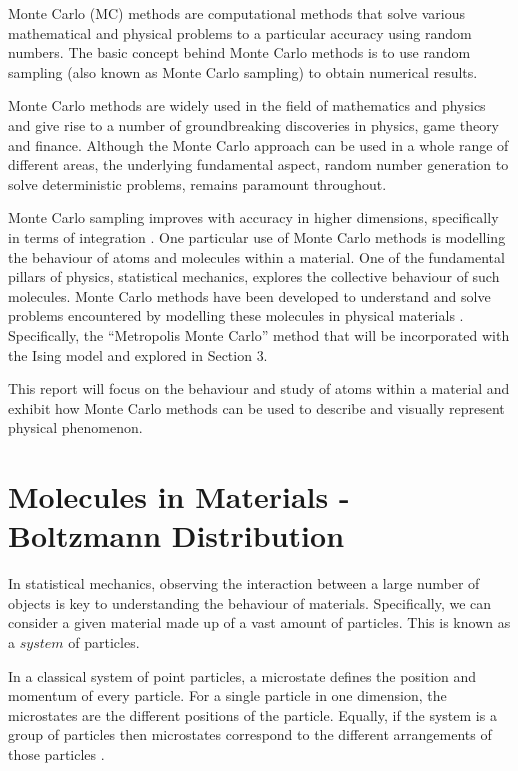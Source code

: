 \documentclass[a4paper]{article}
\begin{document}
Monte Carlo (MC) methods are computational methods that solve various mathematical and physical problems to a particular accuracy using random numbers. The basic concept behind Monte Carlo methods is to use random sampling (also known as Monte Carlo sampling) to obtain numerical results.

Monte Carlo methods are widely used in the field of mathematics and physics and give rise to a number of groundbreaking discoveries in physics, game theory and finance. Although the Monte Carlo approach can be used in a whole range of different areas, the underlying fundamental aspect, random number generation to solve deterministic problems, remains paramount throughout. 

Monte Carlo sampling improves with accuracy in higher dimensions, specifically in terms of integration \cite{1}. One particular use of Monte Carlo methods is modelling the behaviour of atoms and molecules within a material. One of the fundamental pillars of physics, statistical mechanics, explores the collective behaviour of such molecules. Monte Carlo methods have been developed to understand and solve problems encountered by modelling these molecules in physical materials \cite{2}. Specifically, the “Metropolis Monte Carlo” method that will be incorporated with the Ising model and explored in Section 3.

This report will focus on the behaviour and study of atoms within a material and exhibit how Monte Carlo methods can be used to describe and visually represent physical phenomenon.

\section{Molecules in Materials - Boltzmann Distribution}

In statistical mechanics, observing the interaction between a large number of objects is key to understanding the behaviour of materials. Specifically, we can consider a given material made up of a vast amount of particles. This is known as a $system$ of particles. 

In a classical system of point particles, a microstate defines the position and momentum of every particle. For a single particle in one dimension, the microstates are the different positions of the particle. Equally, if the system is a group of particles then microstates correspond to the different arrangements of those particles \cite{2}.
\end{document}
